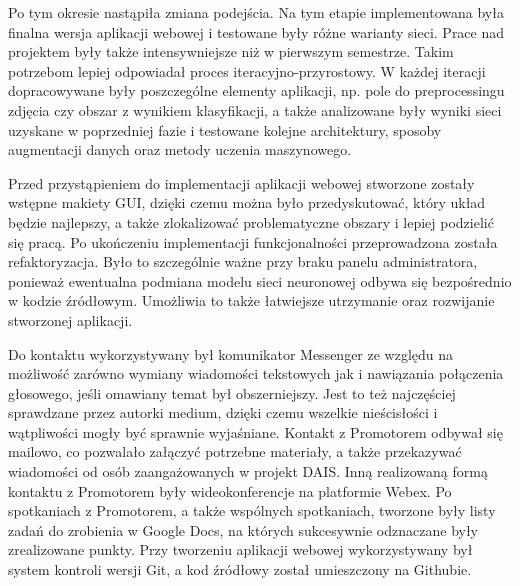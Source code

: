\documentclass[polish,12pt]{aghthesis}
\begin{document}
Po tym okresie nastąpiła zmiana podejścia. Na tym etapie implementowana była finalna wersja aplikacji webowej i testowane były różne warianty sieci. Prace nad projektem były także intensywniejsze niż w pierwszym semestrze. Takim potrzebom lepiej odpowiadał proces iteracyjno-przyrostowy. W każdej iteracji dopracowywane były poszczególne elementy aplikacji, np. pole do preprocessingu zdjęcia czy obszar z wynikiem klasyfikacji, a także analizowane były wyniki sieci uzyskane w poprzedniej fazie i testowane kolejne architektury, sposoby augmentacji danych oraz metody uczenia maszynowego.

Przed przystąpieniem do implementacji aplikacji webowej stworzone zostały wstępne makiety GUI, dzięki czemu można było przedyskutować, który układ będzie najlepszy, a także zlokalizować problematyczne obszary i lepiej podzielić się pracą. Po ukończeniu implementacji funkcjonalności przeprowadzona została refaktoryzacja. Było to szczególnie ważne przy braku panelu administratora, ponieważ ewentualna podmiana modelu sieci neuronowej odbywa się bezpośrednio w kodzie źródłowym. Umożliwia to także łatwiejsze utrzymanie oraz rozwijanie stworzonej aplikacji.
\par
Do kontaktu wykorzystywany był komunikator Messenger ze względu na możliwość zarówno wymiany wiadomości tekstowych jak i nawiązania połączenia głosowego, jeśli omawiany temat był obszerniejszy. Jest to też najczęściej sprawdzane przez autorki medium, dzięki czemu wszelkie nieścisłości i wątpliwości mogły być sprawnie wyjaśniane. Kontakt z Promotorem odbywał się mailowo, co pozwalało załączyć potrzebne materiały, a także przekazywać wiadomości od osób zaangażowanych w projekt DAIS. Inną realizowaną formą kontaktu z Promotorem były wideokonferencje na platformie Webex.
Po spotkaniach z Promotorem, a także wspólnych spotkaniach, tworzone były listy zadań do zrobienia w Google Docs, na których sukcesywnie odznaczane były zrealizowane punkty. 
Przy tworzeniu aplikacji webowej wykorzystywany był system kontroli wersji Git, a kod źródłowy został umieszczony na Githubie. 
\end{document}
